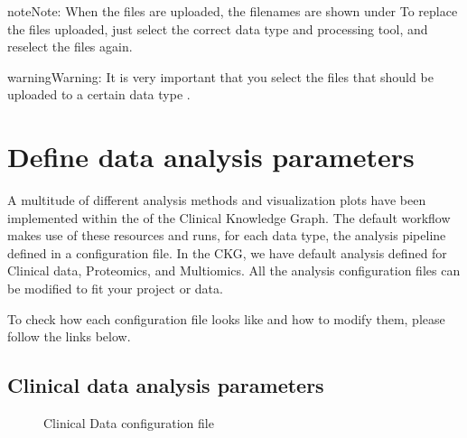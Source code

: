 \documentclass[letterpaper,10pt,english]{sphinxmanual}
\let\sphinxpxdimen\pdfpxdimen\else\newdimen\sphinxpxdimen
\begin{document}
\begin{sphinxadmonition}{note}{Note:}
When the files are uploaded, the filenames are shown under 
To replace the files uploaded, just select the correct data type and processing tool, and reselect the files again.
\end{sphinxadmonition}

\begin{sphinxadmonition}{warning}{Warning:}
It is very important that you select  the files that should be uploaded to a certain data type .
\end{sphinxadmonition}


\section{Define data analysis parameters}
\label{\detokenize{getting_started/data-analysis-config:define-data-analysis-parameters}}\label{\detokenize{getting_started/data-analysis-config::doc}}
A multitude of different analysis methods and visualization plots have been implemented within the  of the Clinical Knowledge Graph.
The default workflow makes use of these resources and runs, for each data type, the analysis pipeline defined in a configuration file. In the CKG, we have
default analysis defined for Clinical data, Proteomics, and Multiomics. All the analysis configuration files can be modified to fit your project or data.

To check how each configuration file looks like and how to modify them, please follow the links below.


\subsection{Clinical data analysis parameters}
\label{\detokenize{getting_started/data_settings/clinical-data:clinical-data-analysis-parameters}}\label{\detokenize{getting_started/data_settings/clinical-data:clinical-data-conf-file}}\label{\detokenize{getting_started/data_settings/clinical-data::doc}}\begin{wrapfigure}{r}{350\sphinxpxdimen}
\centering
\noindent\sphinxincludegraphics[width=350\sphinxpxdimen]{{clinical_config}.png}
\caption{Clinical Data configuration file}\label{\detokenize{getting_started/data_settings/clinical-data:id1}}\end{wrapfigure}
\end{document}
